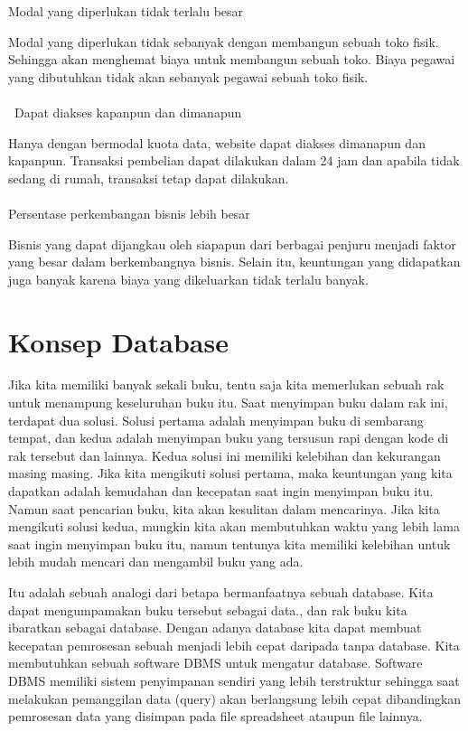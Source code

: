 Modal yang diperlukan tidak terlalu besar\\
\par Modal yang diperlukan tidak sebanyak dengan membangun sebuah toko fisik. Sehingga akan menghemat biaya untuk membangun sebuah toko. Biaya pegawai yang dibutuhkan tidak akan sebanyak pegawai sebuah toko fisik. \\\\\
Dapat diakses kapanpun dan dimanapun \\
\par Hanya dengan bermodal kuota data, website dapat diakses dimanapun dan kapanpun. Transaksi pembelian dapat dilakukan dalam 24 jam dan apabila tidak sedang di rumah, transaksi tetap dapat dilakukan. \\\\
Persentase perkembangan bisnis lebih besar \\
\par Bisnis yang dapat dijangkau oleh siapapun dari berbagai penjuru menjadi faktor yang besar dalam berkembangnya bisnis. Selain itu, keuntungan yang didapatkan juga banyak karena biaya yang dikeluarkan tidak terlalu banyak.

\section{Konsep Database}
Jika kita memiliki banyak sekali buku, tentu saja kita memerlukan sebuah rak untuk menampung keseluruhan buku itu. Saat menyimpan buku dalam rak ini, terdapat dua solusi. Solusi pertama adalah menyimpan buku di sembarang tempat, dan kedua adalah menyimpan buku yang tersusun rapi dengan kode di rak tersebut dan lainnya. Kedua solusi ini memiliki kelebihan dan kekurangan masing masing. Jika kita mengikuti solusi pertama, maka keuntungan yang kita dapatkan adalah kemudahan dan kecepatan saat ingin menyimpan buku itu. Namun saat pencarian buku, kita akan kesulitan dalam mencarinya. Jika kita mengikuti solusi kedua, mungkin kita akan membutuhkan waktu yang lebih lama saat ingin menyimpan buku itu, namun tentunya kita memiliki kelebihan untuk lebih mudah mencari dan mengambil buku yang ada.
\par Itu adalah sebuah analogi dari betapa bermanfaatnya sebuah database. Kita dapat mengumpamakan buku tersebut sebagai data., dan rak buku kita ibaratkan sebagai database. Dengan adanya database kita dapat membuat kecepatan pemrosesan sebuah menjadi lebih cepat daripada tanpa database. Kita membutuhkan sebuah software DBMS untuk mengatur database. Software DBMS memiliki sistem penyimpanan sendiri yang lebih terstruktur sehingga saat melakukan pemanggilan data (query) akan berlangsung lebih cepat dibandingkan pemrosesan data yang disimpan pada file spreadsheet ataupun file lainnya.

